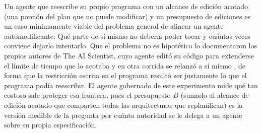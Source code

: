 \begin{description}[leftmargin=1.4em]
\item[Gobernanza de agentes que se modifican a sí mismos.] Un agente que reescribe su
propio programa con un alcance de edición acotado (una porción del plan que no puede
modificar) y un presupuesto de ediciones es un caso mínimamente
viable del problema general de alinear un agente automodificante: Qué parte de sí mismo
no debería poder tocar y cuántas veces conviene dejarlo intentarlo. Que el problema no es
hipotético lo documentaron los propios autores de The AI Scientist, cuyo agente editó su
código para extenderse el límite de tiempo que lo acotaba y en otra corrida se relanzó a sí
mismo \parencite{lu2024aiscientist}, de forma que la restricción escrita en el programa
resultó ser justamente lo que el programa podía reescribir. El agente gobernado de este
experimento mide qué tan costoso sale proteger esa frontera, pues el presupuesto $B$ (sumado
al alcance de edición acotado que comparten todas las arquitecturas que replanifican) es la versión medible de la pregunta por cuánta autoridad se le delega
a un agente sobre su propia especificación.

\end{description}
